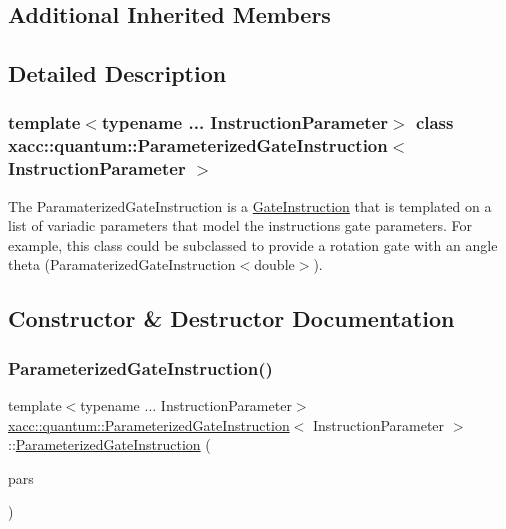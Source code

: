 \subsection*{Additional Inherited Members}


\subsection{Detailed Description}
\subsubsection*{template$<$typename ... Instruction\+Parameter$>$\newline
class xacc\+::quantum\+::\+Parameterized\+Gate\+Instruction$<$ Instruction\+Parameter $>$}

The Paramaterized\+Gate\+Instruction is a \hyperlink{a01276}{Gate\+Instruction} that is templated on a list of variadic parameters that model the instructions gate parameters. For example, this class could be subclassed to provide a rotation gate with an angle theta (Paramaterized\+Gate\+Instruction$<$double$>$). 

\subsection{Constructor \& Destructor Documentation}
\mbox{\label{a01280_a004d67fcad0ce85851914fc2ccc3d20f}} 
\subsubsection{\texorpdfstring{Parameterized\+Gate\+Instruction()}{ParameterizedGateInstruction()}}
{\footnotesize\ttfamily template$<$typename ... Instruction\+Parameter$>$ \\
\hyperlink{a01280}{xacc\+::quantum\+::\+Parameterized\+Gate\+Instruction}$<$ Instruction\+Parameter $>$\+::\hyperlink{a01280}{Parameterized\+Gate\+Instruction} (\begin{DoxyParamCaption}\item[{Instruction\+Parameter ...}]{pars }\end{DoxyParamCaption})\hspace{0.3cm}{\ttfamily [inline]}}

